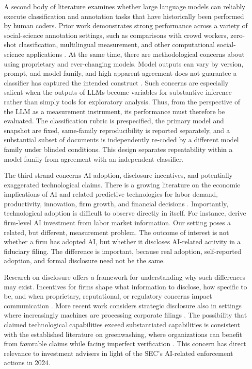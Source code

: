\documentclass[utf8]{FrontiersinHarvard}
\begin{document}
A second body of literature examines whether large language models can reliably execute classification and annotation tasks that have historically been performed by human coders. Prior work demonstrates strong performance across a variety of social-science annotation settings, such as comparisons with crowd workers, zero-shot classification, multilingual measurement, and other computational social-science applications \citep{gilardi2023,tornberg2023,ziems2024,rathje2024}. At the same time, there are methodological concerns about using proprietary and ever-changing models. Model outputs can vary by version, prompt, and model family, and high apparent agreement does not guarantee a classifier has captured the intended construct \citep{bommasani2021,ollion2024}. Such concerns are especially salient when the outputs of LLMs become variables for substantive inference rather than simply tools for exploratory analysis. Thus, from the perspective of the LLM as a measurement instrument, its performance must therefore be evaluated. The classification rubric is prespecified, the primary model and snapshot are fixed, same-family reproducibility is reported separately, and a substantial subset of documents is independently re-coded by a different model family under blinded conditions. This design separates repeatability within a model family from agreement with an independent classifier.

The third strand concerns AI adoption, disclosure incentives, and potentially exaggerated technological claims. There is a growing literature on the economic implications of AI and related predictive technologies for labor demand, productivity, innovation, firm growth, and financial decisions \citep{agrawal2018,dacunto2019,acemoglu2022,eisfeldt2023,noy2023,babina2024,brynjolfsson2025}. Importantly, technological adoption is difficult to observe directly in itself. For instance, \citet{babina2024} derive firm-level AI investment from labor market information. Our setting poses a related, but different, measurement problem. The outcome of interest is not whether a firm has adopted AI, but whether it discloses AI-related activity in a fiduciary filing. The difference is important, because real adoption, self-reported adoption, and formal disclosure need not be the same.

Research on disclosure offers a framework for understanding why such differences may exist. Incentives for firms shape what information to disclose, how specific to be, and when proprietary, reputational, or regulatory concerns impact communication \citep{verrecchia2001,healy2001,leuz2016,blankespoor2020}. More recent work considers strategic disclosure also in settings where increasingly machines are processing corporate filings \citep{cao2024}. The possibility that claimed technological capabilities exceed substantiated capabilities is consistent with the established literature on greenwashing, where organizations can benefit from favorable claims while facing imperfect verification \citep{delmas2011,lyon2015}. This concern has direct relevance to investment advisers in light of the SEC's AI-related enforcement actions in 2024.
\end{document}
